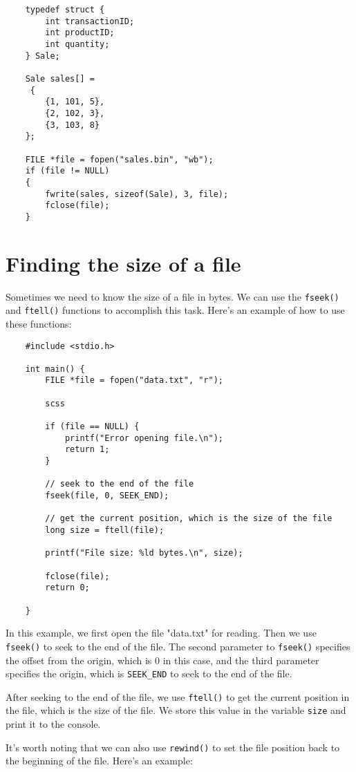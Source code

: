 \begin{verbatim}
	typedef struct {
		int transactionID;
		int productID;
		int quantity;
	} Sale;
	
	Sale sales[] =
	 {
		{1, 101, 5},
		{2, 102, 3},
		{3, 103, 8}
	};
	
	FILE *file = fopen("sales.bin", "wb");
	if (file != NULL) 
	{
		fwrite(sales, sizeof(Sale), 3, file);
		fclose(file);
	}
\end{verbatim}




\section{Finding the size of a file}

Sometimes we need to know the size of a file in bytes. We can use the {\tt fseek()} and {\tt ftell()} functions to accomplish this task. Here's an example of how to use these functions:

\begin{verbatim}
	#include <stdio.h>
	
	int main() {
		FILE *file = fopen("data.txt", "r");
		
		scss
		
		if (file == NULL) {
			printf("Error opening file.\n");
			return 1;
		}
		
		// seek to the end of the file
		fseek(file, 0, SEEK_END);
		
		// get the current position, which is the size of the file
		long size = ftell(file);
		
		printf("File size: %ld bytes.\n", size);
		
		fclose(file);
		return 0;
		
	}
\end{verbatim}

In this example, we first open the file "data.txt" for reading. Then we use {\tt fseek()} to seek to the end of the file. The second parameter to {\tt fseek()} specifies the offset from the origin, which is 0 in this case, and the third parameter specifies the origin, which is {\tt SEEK_END} to seek to the end of the file.

After seeking to the end of the file, we use {\tt ftell()} to get the current position in the file, which is the size of the file. We store this value in the variable {\tt size} and print it to the console.

It's worth noting that we can also use {\tt rewind()} to set the file position back to the beginning of the file. Here's an example:

